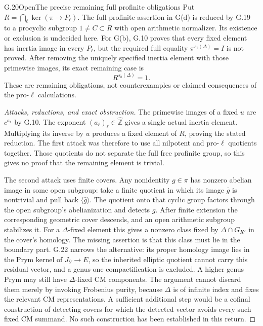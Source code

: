 \begin{statement}{G.20}{Open}{The precise remaining full profinite obligations}
Put $R=\bigcap_\ell\ker(\pi\to P_\ell)$. The full profinite
assertion in G(d) is reduced by G.19 to a procyclic subgroup
$1\ne C\subset R$ with open arithmetic normalizer. Its existence
or exclusion is undecided here. For G(b), G.10 proves that every
fixed element has inertia image in every $P_\ell$, but the
required full equality $\pi^{s_b(\Delta)}=I$ is not proved.
After removing the uniquely specified inertia element with those
primewise images, its exact remaining case is
\[
                         R^{s_b(\Delta)}=1.
\]
These are remaining obligations, not counterexamples or claimed
consequences of the pro-$\ell$ calculations.
\end{statement}
\begin{proof}[Attacks, reductions, and exact obstruction]
The primewise images of a fixed $u$ are $c^{a_\ell}$ by G.10.
The exponent $(a_\ell)_\ell\in\widehat{\mathbb Z}$ gives a
single actual inertia element. Multiplying its inverse by $u$
produces a fixed element of $R$, proving the stated reduction.
The first attack was therefore to use all nilpotent and pro-$\ell$
quotients together. Those quotients do not separate the full free
profinite group, so this gives no proof that the remaining element
is trivial.

The second attack uses finite covers. Any nonidentity $g\in\pi$
has nonzero abelian image in some open subgroup: take a finite
quotient in which its image $\bar g$ is nontrivial and pull back
$\langle\bar g\rangle$. The quotient onto that cyclic group
factors through the open subgroup's abelianization and detects $g$.
After finite extension the corresponding geometric cover descends,
and an open arithmetic subgroup stabilizes it. For a
$\Delta$-fixed element this gives a nonzero class fixed by
$\Delta\cap G_{K'}$ in the cover's homology. The missing assertion
is that this class must lie in the boundary part. G.22 narrows
the alternative: its proper homology image lies in the Prym
kernel of $J_{\overline Y}\to E$, so the inherited elliptic
quotient cannot carry this residual vector, and a genus-one
compactification is excluded. A higher-genus Prym may still
have $\Delta$-fixed CM components. The argument cannot discard
them merely by invoking Frobenius purity, because $\Delta$ is
of infinite index and fixes the relevant CM representations.
A sufficient additional
step would be a cofinal construction of detecting covers for which
the detected vector avoids every such fixed CM summand. No such
construction has been established in this return.


\end{proof}
